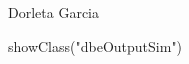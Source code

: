 \begin{Author}\relax
Dorleta Garcia 
\end{Author}
\begin{SeeAlso}\relax
{}
\end{SeeAlso}
\begin{Examples}
\begin{ExampleCode}
showClass("dbeOutputSim")
\end{ExampleCode}
\end{Examples}

